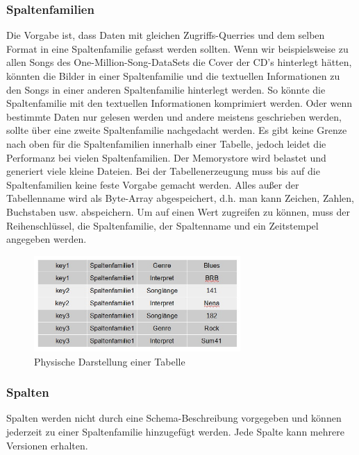 \subsubsection{Spaltenfamilien}\label{sf}
Die Vorgabe ist, dass Daten mit gleichen Zugriffs-Querries und dem selben Format in eine Spaltenfamilie gefasst werden sollten. Wenn wir beispielsweise zu allen Songs des One-Million-Song-DataSets die Cover der CD's hinterlegt hätten, könnten die Bilder in einer Spaltenfamilie und die textuellen Informationen zu den Songs in einer anderen Spaltenfamilie hinterlegt werden. So könnte die Spaltenfamilie mit den textuellen Informationen komprimiert werden. Oder wenn bestimmte Daten nur gelesen werden und andere meistens geschrieben werden, sollte über eine zweite Spaltenfamilie nachgedacht werden. Es gibt keine Grenze nach oben für die Spaltenfamilien innerhalb einer Tabelle, jedoch leidet die Performanz bei vielen Spaltenfamilien. Der Memorystore wird belastet und generiert viele kleine Dateien. Bei der Tabellenerzeugung  muss bis auf die Spaltenfamilien keine feste Vorgabe gemacht werden. Alles außer der Tabellenname wird als Byte-Array abgespeichert, d.h. man kann Zeichen, Zahlen, Buchstaben usw. abspeichern. Um auf einen Wert zugreifen zu können, muss der Reihenschlüssel, die Spaltenfamilie, der Spaltenname und ein Zeitstempel angegeben werden.

\begin{figure}[htbp] 
  \centering
     \includegraphics[width=0.7\textwidth]{images/physisch.jpg}
  \caption{Physische Darstellung einer Tabelle}
  \label{fig:Physische Darstellung einer Tabelle}
\end{figure}



\subsubsection{Spalten}
Spalten werden nicht durch eine Schema-Beschreibung vorgegeben und können jederzeit zu einer Spaltenfamilie hinzugefügt werden. Jede Spalte kann mehrere Versionen erhalten. 

